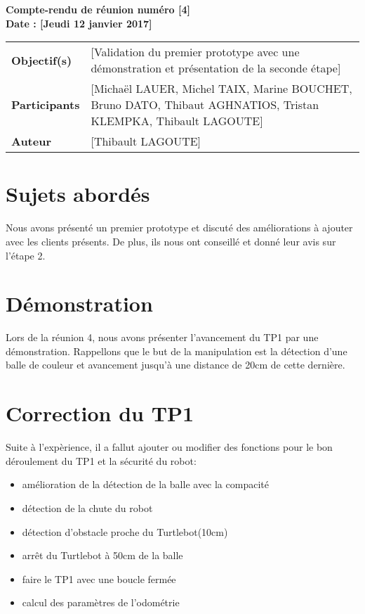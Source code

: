 \documentclass[a4wide,10pt]{article}
\begin{document}
\thispagestyle{empty}

\begin{center}
\LARGE \bfseries  Compte-rendu de réunion numéro [4] \\
\large \bfseries  Date : [Jeudi 12 janvier 2017]

\vspace{0.33cm}
\end{center}

\begin{center}
\begin{tabular}{ p{2.2cm}  p{13.6cm} }
\textbf{Objectif(s)} & [Validation du premier prototype avec une démonstration et présentation de la seconde étape]  \\
\textbf{Participants} & [Michaël LAUER, Michel TAIX, Marine BOUCHET, Bruno DATO, Thibaut AGHNATIOS, Tristan KLEMPKA, Thibault LAGOUTE] \\ 
\textbf{Auteur} & [Thibault LAGOUTE]  \\
\end{tabular}
\end{center}

\section*{Sujets abordés}

Nous avons présenté un premier prototype et discuté des améliorations à ajouter avec les clients présents. De plus, ils nous ont conseillé et donné leur avis sur l'étape 2.


\section*{Démonstration}


Lors de la réunion 4, nous avons présenter l'avancement du TP1 par une démonstration. Rappellons que le but de la manipulation est la détection d'une balle de couleur et avancement jusqu'à une distance de 20cm de cette dernière. \\  
	

\section*{Correction du TP1}

Suite à l'expèrience, il a fallut ajouter ou modifier des fonctions pour le bon déroulement du TP1 et la sécurité du robot:

\begin{itemize}
\item amélioration de la détection de la balle avec la compacité
\item détection de la chute du robot
\item détection d'obstacle proche du Turtlebot(10cm)
\item arrêt du Turtlebot à 50cm de la balle
\item faire le TP1 avec une boucle fermée 
\item calcul des paramètres de l'odométrie
\end{itemize}
\end{document}

